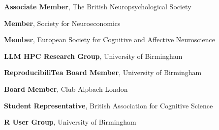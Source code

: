 	{\textbf{Associate Member}, The British Neuropsychological Society}

\cvitem{}
	{\textbf{Member}, Society for Neuroeconomics}

\cvitem{}
	{\textbf{Member}, European Society for Cognitive and Affective Neuroscience}

	{\textbf{LLM HPC Research Group}, University of Birmingham}

\cvitem{}
	{\textbf{ReproducibiliTea Board Member}, University of Birmingham}

\cvitem{}
	{\textbf{Board Member}, Club Alpbach London}

	{\textbf{Student Representative}, British Association for Cognitive Science}

	{\textbf{R User Group}, University of Birmingham}
